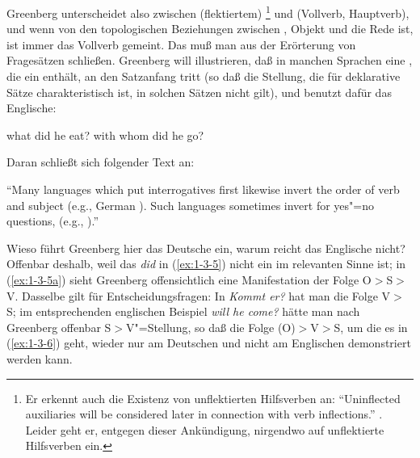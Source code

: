 \documentclass[output=paper]{langsci/langscibook}
\begin{document}
Greenberg unterscheidet also zwischen (flektiertem)
\footnote{%
  Er erkennt auch die Existenz von unflektierten Hilfsverben an: "`Uninflected auxiliaries will be
  considered later in connection with verb inflections."' \citep[85]{Greenberg1963}. Leider geht er,
  entgegen dieser Ankündigung, nirgendwo auf unflektierte Hilfsverben ein.%
} und  (Vollverb, Hauptverb), und wenn von den topologischen Beziehungen zwischen , Objekt und 
die Rede ist, ist immer das Vollverb gemeint. Das muß man aus der Erörterung von Fragesätzen
schließen. Greenberg will illustrieren, daß in manchen Sprachen eine 
, die ein  enthält, an den Satzanfang
tritt (so daß die Stellung, die für deklarative Sätze charakteristisch
ist, in solchen Sätzen nicht gilt), und benutzt dafür das Englische:
\begin{exe}
\ex\label{ex:1-3-5}
\begin{xlist}
\ex\label{ex:1-3-5a} what did he eat?
\ex\label{ex:1-3-5b} with whom did he go?
\end{xlist}
\end{exe}
Daran schließt sich folgender Text an:
\begin{exe}
\ex\label{ex:1-3-6}
"`Many languages which put interrogatives first likewise invert the order of
verb and subject (e.g., German ). Such languages sometimes
invert for yes"=no questions, (e.g., )."' \citep[82]{Greenberg1963}
\end{exe}
Wieso führt Greenberg hier das Deutsche ein, warum reicht das Englische nicht? Offenbar deshalb, weil das \emph{did} in (\ref{ex:1-3-5}) nicht ein  im relevanten Sinne ist; in (\ref{ex:1-3-5a})
sieht Greenberg offensichtlich eine Manifestation der Folge O$>$S$>$V. Dasselbe gilt für
Entscheidungsfragen: In \emph{Kommt er?} hat man die Folge V$>$S; im entsprechenden englischen Beispiel \emph{will he come?} hätte man nach Greenberg offenbar S$>$V"=Stellung, so daß die Folge (O)$>$V$>$S, um die es in (\ref{ex:1-3-6}) geht, wieder nur am Deutschen und
nicht am Englischen demonstriert werden kann.
\end{document}
